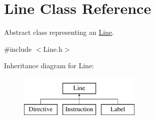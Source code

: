 \hypertarget{class_line}{}\section{Line Class Reference}
\label{class_line}


Abstract class representing an \mbox{\hyperlink{class_line}{Line}}.  




{\ttfamily \#include $<$Line.\+h$>$}

Inheritance diagram for Line\+:\begin{figure}[H]
\begin{center}
\leavevmode
\includegraphics[height=2.000000cm]{class_line}
\end{center}
\end{figure}
